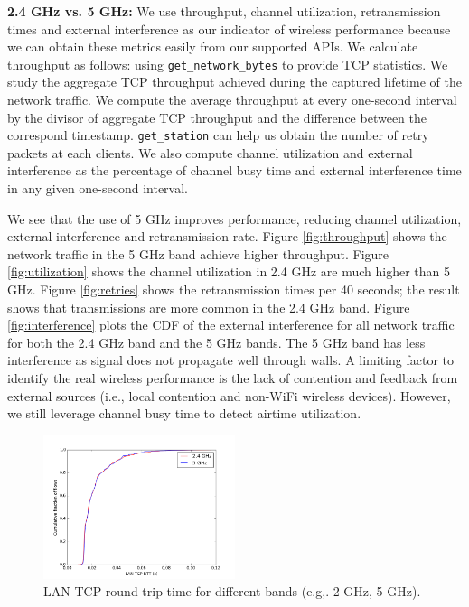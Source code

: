 \textbf{2.4 GHz vs. 5 GHz:} We use throughput, channel utilization, retransmission times and external interference as our indicator of wireless performance because we can obtain these metrics easily from our supported APIs. We calculate throughput as follows: using \texttt{get\_network\_bytes} to provide TCP statistics. We study the aggregate TCP throughput achieved during the captured lifetime of the network traffic. We compute the average throughput at every one-second interval by the divisor of aggregate TCP throughput and the difference between the correspond timestamp. \texttt{get\_station} can help us obtain the number of retry packets at each clients. We also compute channel utilization and external interference as the percentage of channel busy time and external interference time in any given one-second interval. 

We see that the use of 5 GHz improves performance, reducing channel utilization, external interference and retransmission rate. Figure \ref{fig:throughput} shows the network traffic in the 5 GHz band achieve higher throughput. Figure \ref{fig:utilization} shows the channel utilization in 2.4 GHz are much higher than 5 GHz. Figure \ref{fig:retries} shows the retransmission times per 40 seconds; the result shows that transmissions are more common in the 2.4 GHz band. Figure \ref{fig:interference} plots the CDF of the external interference for all network traffic for both the 2.4 GHz band and the 5 GHz bands. The 5 GHz band has less interference as signal does not propagate well through walls. A limiting factor to identify the real wireless performance is the lack of contention and feedback from external sources (i.e., local contention and non-WiFi wireless devices). However, we still leverage channel busy time to detect airtime utilization.

\begin{figure}
\centering
\includegraphics[width=0.5\textwidth]{figure/tcp_rtt.png}
\caption{LAN TCP round-trip time for different bands (e.g,. 2 GHz, 5 GHz).} 
\label{fig:tcprtt}
\end{figure}

